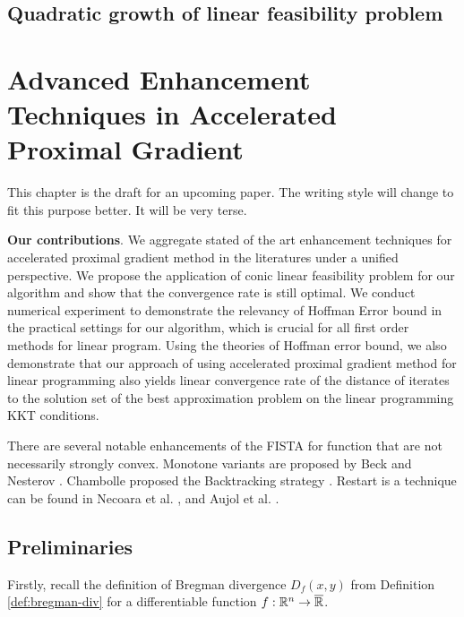 \documentclass[12pt]{report}
\begin{document}
    \section{Quadratic growth of linear feasibility problem}

\chapter{Advanced Enhancement Techniques in Accelerated Proximal Gradient}
    \newcommand{\XXAPG}{AMAPG}

    This chapter is the draft for an upcoming paper. 
    The writing style will change to fit this purpose better. 
    It will be very terse. 
    \par
    \textbf{Our contributions}. We aggregate stated of the art enhancement techniques for accelerated proximal gradient method in the literatures under a unified perspective. 
    We propose the application of conic linear feasibility problem for our algorithm and show that the convergence rate is still optimal. 
    We conduct numerical experiment to demonstrate the relevancy of Hoffman Error bound in the practical settings for our algorithm, which is crucial for all first order methods for linear program. 
    Using the theories of Hoffman error bound, we also demonstrate that our approach of using accelerated proximal gradient method for linear programming also yields linear convergence rate of the distance of iterates to the solution set of the best approximation problem on the linear programming KKT conditions. 
    \par
    There are several notable enhancements of the FISTA for function that are not necessarily strongly convex. 
    Monotone variants are proposed by Beck \cite{beck_fast_2009-1} and Nesterov \cite[2.2.32]{nesterov_lectures_2018}. 
    Chambolle proposed the Backtracking strategy \cite{calatroni_backtracking_2019}.
    Restart is a technique can be found in Necoara et al. \cite{necoara_linear_2019}, \cite{alamo_restart_2019} and Aujol et al. \cite{aujol_parameter-free_2024}. 
    
    \section{Preliminaries}
        Firstly, recall the definition of Bregman divergence $D_f(x, y)$ from Definition \ref{def:bregman-div} for a differentiable function $f:\mathbb R^n \rightarrow \overline {\mathbb R}$. 
\end{document}
